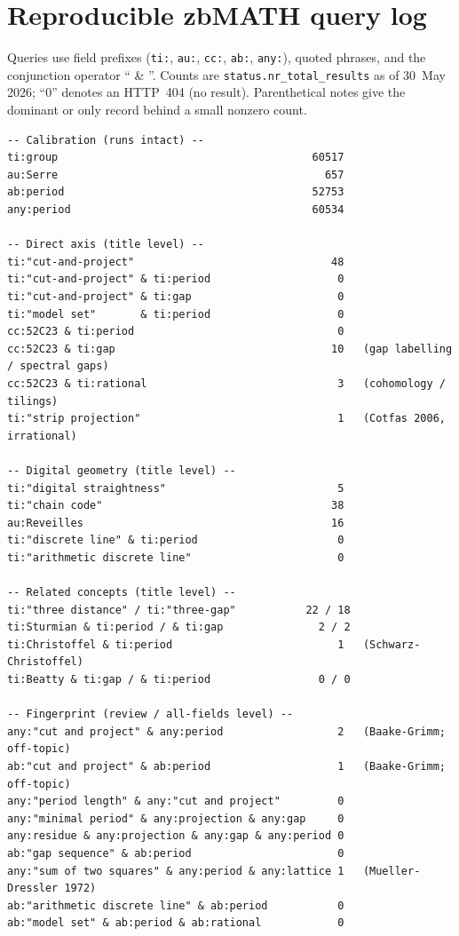 \documentclass[11pt]{article}
\theoremstyle{plain}
\theoremstyle{remark}
\begin{document}
\appendix
\section{Reproducible zbMATH query log}\label{app:queries}

Queries use field prefixes (\texttt{ti:}, \texttt{au:}, \texttt{cc:}, \texttt{ab:},
\texttt{any:}), quoted phrases, and the conjunction operator `` \& ''. Counts are
\texttt{status.nr\_total\_results} as of 30~May 2026; ``$0$'' denotes an HTTP~404
(no result). Parenthetical notes give the dominant or only record behind a small
nonzero count.

\begin{small}
\begin{verbatim}
-- Calibration (runs intact) --
ti:group                                        60517
au:Serre                                          657
ab:period                                       52753
any:period                                      60534

-- Direct axis (title level) --
ti:"cut-and-project"                               48
ti:"cut-and-project" & ti:period                    0
ti:"cut-and-project" & ti:gap                       0
ti:"model set"       & ti:period                    0
cc:52C23 & ti:period                                0
cc:52C23 & ti:gap                                  10   (gap labelling / spectral gaps)
cc:52C23 & ti:rational                              3   (cohomology / tilings)
ti:"strip projection"                               1   (Cotfas 2006, irrational)

-- Digital geometry (title level) --
ti:"digital straightness"                           5
ti:"chain code"                                    38
au:Reveilles                                       16
ti:"discrete line" & ti:period                      0
ti:"arithmetic discrete line"                       0

-- Related concepts (title level) --
ti:"three distance" / ti:"three-gap"           22 / 18
ti:Sturmian & ti:period / & ti:gap               2 / 2
ti:Christoffel & ti:period                          1   (Schwarz-Christoffel)
ti:Beatty & ti:gap / & ti:period                 0 / 0

-- Fingerprint (review / all-fields level) --
any:"cut and project" & any:period                  2   (Baake-Grimm; off-topic)
ab:"cut and project" & ab:period                    1   (Baake-Grimm; off-topic)
any:"period length" & any:"cut and project"         0
any:"minimal period" & any:projection & any:gap     0
any:residue & any:projection & any:gap & any:period 0
ab:"gap sequence" & ab:period                       0
any:"sum of two squares" & any:period & any:lattice 1   (Mueller-Dressler 1972)
ab:"arithmetic discrete line" & ab:period           0
ab:"model set" & ab:period & ab:rational            0
\end{verbatim}
\end{small}
\end{document}
